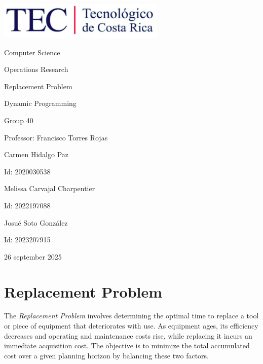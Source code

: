 \documentclass{article}
\begin{document}
\begin{titlepage}
    \centering
    \includegraphics[width=0.6\textwidth]{logo-tec.png}\par\vspace{1cm}

    {\large Computer Science\par}
    {\large Operations Research\par}
    \vspace{2cm}

    {\Large Replacement Problem\par}
    {\large Dynamic Programming\par}
    \vspace{2cm}

    {\large Group 40\par}
    {\large Professor: Francisco Torres Rojas\par}
    \vspace{3cm}

    {\large Carmen Hidalgo Paz\par}
    {\large Id: 2020030538\par}
    \vspace{1cm}
    {\large Melissa Carvajal Charpentier\par}
    {\large Id: 2022197088\par}
    \vspace{1cm}
    {\large Josué Soto González\par}
    {\large Id: 2023207915\par}
    \vspace{1cm}

    {\large 26 september 2025\par}
\end{titlepage}

\newpage


\section{Replacement Problem}
The \textit{Replacement Problem} involves determining the optimal time to replace a tool or piece of equipment that deteriorates with use. As equipment ages, its efficiency decreases and operating and maintenance costs rise, while replacing it incurs an immediate acquisition cost. The objective is to minimize the total accumulated cost over a given planning horizon by balancing these two factors.
\end{document}
